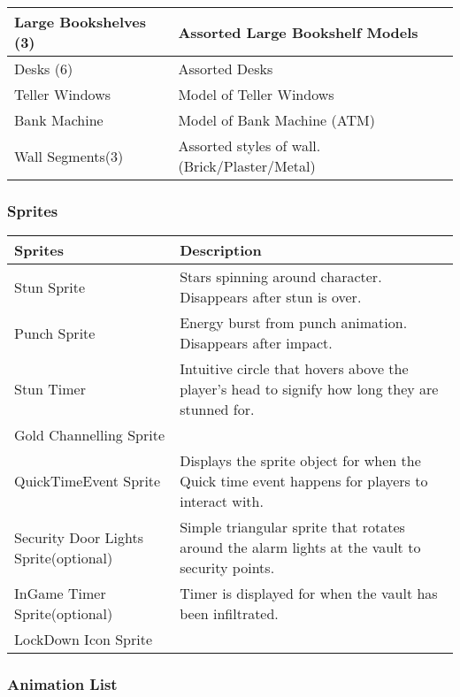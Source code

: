 \documentclass[10pt]{report}
\begin{document}
\begin{center}
\begin{tabular}{| p{.45\linewidth} | p{.45\linewidth} |}
        Large Bookshelves (3)   &    Assorted Large Bookshelf Models        \\ \hline
        Desks (6)   &    Assorted Desks        \\ \hline
        Teller Windows  &   Model of Teller Windows         \\ \hline
        Bank Machine    &   Model of Bank Machine (ATM)        \\ \hline
        Wall Segments(3)    &        Assorted styles of wall. (Brick/Plaster/Metal)\\ \hline    
    \end{tabular}
\end{center}
    
\subsubsection{Sprites}

\begin{center}
    \begin{tabular}{| p{.45\linewidth} | p{.45\linewidth} |}
        \hline 
        \textbf{Sprites}     &   \textbf{Description}  \\ \hline
        Stun Sprite     &   Stars spinning around character. Disappears after stun is over.  \\ \hline
        Punch Sprite    &   Energy burst from punch animation. Disappears after impact.   \\ \hline
        Stun Timer  &   Intuitive circle that hovers above the player’s head to signify how long they are stunned for.   \\ \hline
        Gold Channelling Sprite   &  \\ \hline
        QuickTimeEvent Sprite   &     Displays the sprite object for when the Quick time event happens for players to interact with.  \\ \hline
        Security Door Lights Sprite(optional)   &   Simple triangular sprite that rotates around the alarm lights at the vault to security points.  \\ \hline
        InGame Timer Sprite(optional)   &   Timer is displayed for when the vault has been infiltrated.   \\ \hline
        LockDown Icon Sprite    &       \\  \hline
    \end{tabular}
\end{center}
    
\subsubsection{Animation List}
\end{document}
